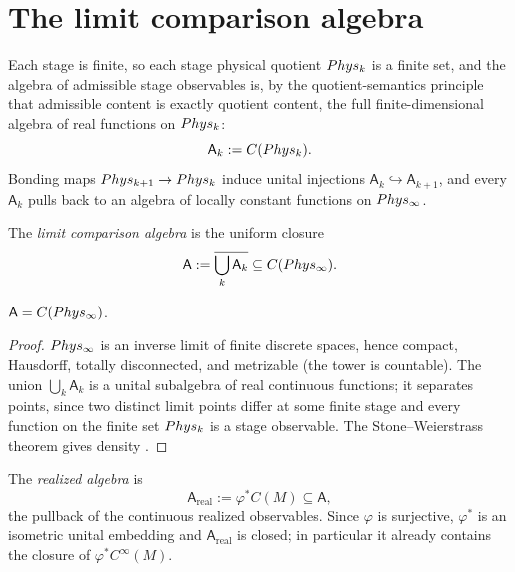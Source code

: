 \section{The limit comparison algebra}
\label{sec:dyn-algebra}
Each stage is finite, so each stage physical quotient \(Phys_k\) is a
finite set, and the algebra of admissible stage observables is, by the
quotient-semantics principle that admissible content is exactly
quotient content, the full finite-dimensional algebra of real
functions on \(Phys_k\):
\[
	\mathsf A_k:=C(Phys_k).
\]
Bonding maps \(Phys_{k+1}\to Phys_k\) induce unital injections
\(\mathsf A_k\hookrightarrow\mathsf A_{k+1}\), and every
\(\mathsf A_k\) pulls back to an algebra of locally constant functions
on \(Phys_\infty\).

\begin{definition}
	\label{def:dyn-limit-algebra}
	The \emph{limit comparison algebra} is the uniform closure
	\[
		\mathsf A
		:=
		\overline{\bigcup_{k}\mathsf A_k}
		\subseteq
		C(Phys_\infty).
	\]
\end{definition}

\begin{lemma}
	\label{lem:dyn-limit-algebra}
	\(\mathsf A=C(Phys_\infty)\).
\end{lemma}
\begin{proof}
	\(Phys_\infty\) is an inverse limit of finite discrete spaces,
	hence compact, Hausdorff, totally disconnected, and metrizable
	(the tower is countable). The union \(\bigcup_k\mathsf A_k\) is a
	unital subalgebra of real continuous functions; it separates
	points, since two distinct limit points differ at some finite
	stage and every function on the finite set \(Phys_k\) is a stage
	observable. The Stone--Weierstrass theorem gives density
	\cite{Rudin1987}.
\end{proof}

\begin{definition}
	\label{def:dyn-realized-algebra}
	The \emph{realized algebra} is
	\[
		\mathsf A_{\mathrm{real}}
		:=
		\varphi^*C(M)\subseteq\mathsf A,
	\]
	the pullback of the continuous realized observables. Since
	\(\varphi\) is surjective, \(\varphi^*\) is an isometric unital
	embedding and \(\mathsf A_{\mathrm{real}}\) is closed; in
	particular it already contains the closure of
	\(\varphi^*C^\infty(M)\).
\end{definition}

